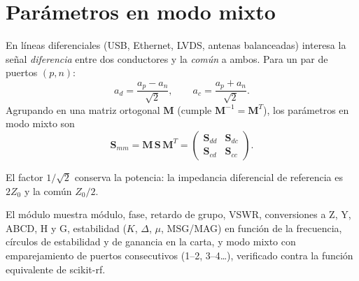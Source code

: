 \section{Parámetros en modo mixto}

En líneas diferenciales (USB, Ethernet, LVDS, antenas balanceadas) interesa la señal \emph{diferencia} entre dos conductores y la
\emph{común} a ambos. Para un par de puertos $(p, n)$:
\begin{equation}
  a_d = \frac{a_p - a_n}{\sqrt2}, \qquad a_c = \frac{a_p + a_n}{\sqrt2}.
\end{equation}
Agrupando en una matriz ortogonal $\mathbf M$ (cumple $\mathbf M^{-1} = \mathbf M^T$), los parámetros en modo mixto son
\begin{equation}
  \mathbf S_{mm} = \mathbf M\,\mathbf S\,\mathbf M^{T} = \begin{pmatrix}\mathbf S_{dd} & \mathbf S_{dc}\\ \mathbf S_{cd} & \mathbf S_{cc}\end{pmatrix}.
\end{equation}
\begin{donde}
\end{donde}
El factor $1/\sqrt2$ conserva la potencia: la impedancia diferencial de referencia es $2Z_0$ y la común $Z_0/2$.

\begin{enlaapp}
El módulo  muestra módulo, fase, retardo de grupo, VSWR, conversiones a Z, Y, ABCD, H y G, estabilidad ($K$, $\Delta$,
$\mu$, MSG/MAG) en función de la frecuencia, círculos de estabilidad y de ganancia en la carta, y modo mixto con emparejamiento de puertos consecutivos
(1--2, 3--4\ldots), verificado contra la función equivalente de scikit-rf.
\end{enlaapp}
